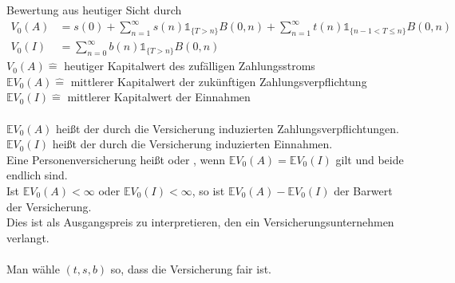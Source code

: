 Bewertung aus heutiger Sicht durch
\begin{equation*}
\begin{aligned}
	V_0(A) &= s(0)+\sum_{n=1}^{\infty}s(n) \mathbb{1}_{\{T>n\}}B(0,n)+\sum_{n=1}^{\infty}t(n)\mathbb{1}_{\{n-1<T\le n \}} B(0,n) \\
	V_0(I) &= \sum_{n=0}^{\infty}b(n)\mathbb{1}_{\{T>n\}} B(0,n)
\end{aligned}
\end{equation*}
$V_0(A) \mathrel{\hat{=}}$ heutiger Kapitalwert des zufälligen Zahlungsstroms\\
$\mathds{E}V_0(A) \mathrel{\hat{=}}$ mittlerer Kapitalwert der zukünftigen Zahlungsverpflichtung\\
$\mathds{E}V_0(I) \mathrel{\hat{=}}$ mittlerer Kapitalwert der Einnahmen\\
\\
$\mathds{E}V_0(A)$ heißt  der durch die Versicherung induzierten Zahlungsverpflichtungen.
$\mathds{E}V_0(I)$ heißt  der durch die Versicherung induzierten Einnahmen.\\
Eine Personenversicherung heißt  oder , wenn $\mathds{E}V_0(A)=\mathds{E}V_0(I)$ gilt und beide endlich sind.\\
Ist $\mathds{E}V_0(A)<\infty$ oder $\mathds{E}V_0(I)<\infty$, so ist $\mathds{E}V_0(A)-\mathds{E}V_0(I)$ der Barwert der Versicherung.\\
Dies ist als Ausgangspreis zu interpretieren, den ein Versicherungsunternehmen verlangt.\\
\\
Man wähle $(t,s,b)$ so, dass die Versicherung fair ist.


